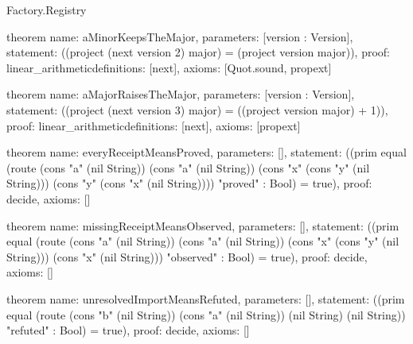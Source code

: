 \begin{lexlean}{Factory.Registry}
\begin{semanticmodule}
theorem{
  name: aMinorKeepsTheMajor,
  parameters: [version : Version],
  statement: ((project (next version 2) major) = (project version major)),
  proof: linear_arithmetic{definitions: [next]},
  axioms: [Quot.sound, propext]
}

theorem{
  name: aMajorRaisesTheMajor,
  parameters: [version : Version],
  statement: ((project (next version 3) major) = ((project version major) + 1)),
  proof: linear_arithmetic{definitions: [next]},
  axioms: [propext]
}

theorem{
  name: everyReceiptMeansProved,
  parameters: [],
  statement: ((prim equal (route (cons "a" (nil String)) (cons "a" (nil String)) (cons "x" (cons "y" (nil String))) (cons "y" (cons "x" (nil String)))) "proved" : Bool) = true),
  proof: decide{},
  axioms: []
}

theorem{
  name: missingReceiptMeansObserved,
  parameters: [],
  statement: ((prim equal (route (cons "a" (nil String)) (cons "a" (nil String)) (cons "x" (cons "y" (nil String))) (cons "x" (nil String))) "observed" : Bool) = true),
  proof: decide{},
  axioms: []
}

theorem{
  name: unresolvedImportMeansRefuted,
  parameters: [],
  statement: ((prim equal (route (cons "b" (nil String)) (cons "a" (nil String)) (nil String) (nil String)) "refuted" : Bool) = true),
  proof: decide{},
  axioms: []
}
\end{semanticmodule}
\end{lexlean}
